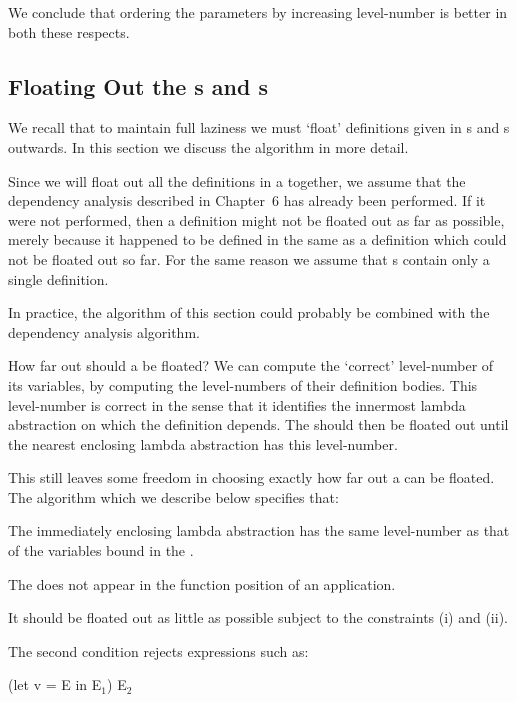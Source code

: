 We conclude that ordering the parameters by increasing level-number is
better in both these respects.

\subsection{Floating Out the s and s}

We recall that to maintain full laziness we must `float' definitions given in s
and s outwards. In this section we discuss the algorithm in more detail.

Since we will float out all the definitions in a  together, we assume that
the dependency analysis described in Chapter~6 has already been performed.
If it were not performed, then a definition might not be floated out as far as
possible, merely because it happened to be defined in the same  as a
definition which could not be floated out so far. For the same reason we
assume that s contain only a single definition.

In practice, the algorithm of this section could probably be combined with
the dependency analysis algorithm.

How far out should a  be floated? We can compute the `correct'
level-number of its variables, by computing the level-numbers of their
definition bodies. This level-number is correct in the sense that it identifies the
innermost lambda abstraction on which the definition depends. The 
should then be floated out until the nearest enclosing lambda abstraction has
this level-number.

This still leaves some freedom in choosing exactly how far out a  can
be floated. The algorithm which we describe below specifies that:
\begin{numbered}
    \item The immediately enclosing lambda abstraction has the same level-number as that of the variables bound in the .
    \item The  does not appear in the function position of an application.
    \item It should be floated out as little as possible subject to the constraints (i)
    and (ii).
\end{numbered}

The second condition rejects expressions such as:

\begin{mlcoded}
    (let v = E in E$_1$) E$_2$
\end{mlcoded}

